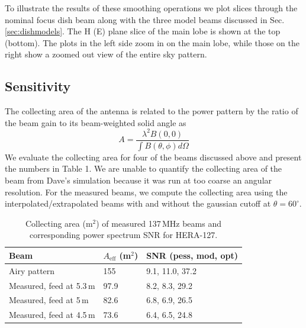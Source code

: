 \documentclass[preprint]{aastex}
\begin{document}

To illustrate the results of these smoothing operations we plot slices through the nominal focus dish beam along with the three model beams discussed in Sec. \ref{sec:dishmodels}. The H (E) plane slice of the main lobe is shown at the top (bottom). The plots in the left side zoom in on the main lobe, while those on the right show a zoomed out view of the entire sky pattern. 

\subsection{Sensitivity}

The collecting area of the antenna is related to the power pattern by the ratio of the beam gain to its beam-weighted solid angle as
\begin{equation}
	A=\frac{\lambda^2 B(0,0)}{\int B(\theta,\phi)d\Omega}
\end{equation}
We evaluate the collecting area for four of the beams discussed above and present the numbers in Table 1. We are unable to quantify the collecting area of the beam from Dave's simulation because it was run at too coarse an angular resolution. For the measured beams, we compute the collecting area using the interpolated/extrapolated beams with and without the gaussian cutoff at $\theta=60^\circ$.

 \begin{table}[h]
 \caption{ \label{table:collectingareatable}Collecting area (m$^2$) of measured 137\,MHz beams and corresponding power spectrum SNR for HERA-127.}
\begin{tabular}{| l | l | l |}
\hline
Beam & $A_\text{eff}$ (m$^2$) & SNR (pess, mod, opt)\\
\hline
  Airy pattern & 155 & 9.1, 11.0, 37.2  \\
    Measured, feed at 5.3\,m & 97.9 & 8.2, 8.3, 29.2 \\
    Measured, feed at 5\,m & 82.6 & 6.8, 6.9, 26.5 \\
    Measured, feed at 4.5\,m & 73.6 & 6.4, 6.5, 24.8 \\ 
  \hline
\end{tabular}
\end{table}\
\end{document}
